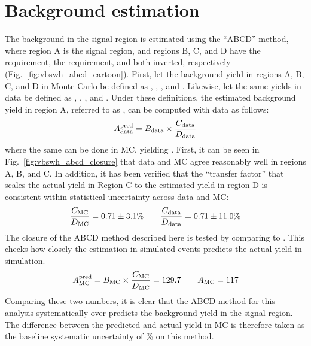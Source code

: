 \section{Background estimation}
The background in the signal region is estimated using the ``ABCD'' method, where region A is the signal region, and regions B, C, and D have the \detajj requirement, the \MSD requirement, and both inverted, respectively (Fig.~\ref{fig:vbswh_abcd_cartoon}). 
First, let the background yield in regions A, B, C, and D in Monte Carlo be defined as \AMC, \BMC, \CMC, and \DMC.
Likewise, let the same yields in data be defined as  \Adata, \Bdata, \Cdata, and \Ddata.
Under these definitions, the estimated background yield in region A, referred to as \AdataPred, can be computed with data as follows:
\begin{equation}\label{eq:vbswh_abcd}
    A_{\text{data}}^{\text{pred}} = B_{\text{data}}\times\frac{C_{\text{data}}}{D_{\text{data}}}
\end{equation}
\noindent where the same can be done in MC, yielding \AMCPred. 
First, it can be seen in Fig.~\ref{fig:vbswh_abcd_closure} that data and MC agree reasonably well in regions A, B, and C. 
In addition, it has been verified that the ``transfer factor'' that scales the actual yield in Region C to the estimated yield in region D is consistent within statistical uncertainty across data and MC:
\begin{equation*}
    \frac{C_{\mathrm{MC}}}{D_{\mathrm{MC}}} = 0.71 \pm 3.1\% \qquad \frac{C_{\text{data}}}{D_{\text{data}}} = 0.71 \pm 11.0\%
\end{equation*}
The closure of the ABCD method described here is tested by comparing \AMCPred to \AMC. 
This checks how closely the estimation in simulated events predicts the actual yield in simulation. 
\begin{equation*}
    A_{\mathrm{MC}}^{\text{pred}} = B_{\mathrm{MC}}\times\frac{C_{\mathrm{MC}}}{D_{\mathrm{MC}}} = 129.7 \qquad A_{\mathrm{MC}} = 117
\end{equation*}
Comparing these two numbers, it is clear that the ABCD method for this analysis systematically over-predicts the background yield in the signal region. 
The difference between the predicted and actual yield in MC is therefore taken as the baseline systematic uncertainty of \BkgEstMethodSystErr\% on this method. 
